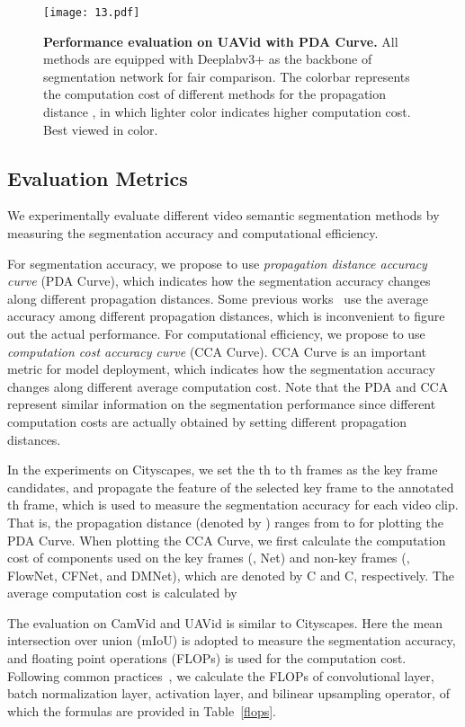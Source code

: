 \documentclass[journal]{IEEEtran}
\begin{document}
\begin{figure}[t]
	\begin{center}
		\texttt{[image: 13.pdf]}
	\end{center}
	\caption{\textbf{Performance evaluation on UAVid with PDA Curve.} All methods are equipped with Deeplabv3+ as the backbone of segmentation network for fair comparison. The colorbar represents the computation cost of different methods for the propagation distance , in which lighter color indicates higher computation cost. Best viewed in color.}
	\label{exp_SCM_uavid}
\end{figure}

\subsection{Evaluation Metrics}
We experimentally evaluate different video semantic segmentation methods by measuring the segmentation accuracy and computational efficiency. 

For segmentation accuracy, we propose to use \emph{propagation distance \vs accuracy curve} (PDA Curve), which indicates how the segmentation accuracy changes along different propagation distances. Some previous works~\cite{zhu2017deep,jain2019accel} use the average accuracy among different propagation distances, which is inconvenient to figure out the actual performance. For computational efficiency, we propose to use \emph{computation cost \vs accuracy curve} (CCA Curve). CCA Curve is an important metric for model deployment, which indicates how the segmentation accuracy changes along different average computation cost.
Note that the PDA and CCA represent similar information on the segmentation performance since different computation costs are actually obtained by setting different propagation distances.

In the experiments on Cityscapes, we set the {th} to {th} frames as the key frame candidates, and propagate the feature of the selected key frame to the annotated {th} frame, which is used to measure the segmentation accuracy for each video clip. That is, the propagation distance (denoted by ) ranges from  to  for plotting the PDA Curve. When plotting the CCA Curve, we first calculate the computation cost of components used on the key frames (\ie, Net) and non-key frames (\ie, FlowNet, CFNet, and DMNet), which are denoted by C and C, respectively. The average computation cost is calculated by

The evaluation on CamVid and UAVid is similar to Cityscapes. Here the mean intersection over union (mIoU) is adopted to measure the segmentation accuracy, and floating point operations (FLOPs) is used for the computation cost. Following common practices~\cite{molchanov2019pruning,howard2017mobilenets}, we calculate the FLOPs of convolutional layer, batch normalization layer, activation layer, and bilinear upsampling operator, of which the formulas are provided in Table~\ref{flops}. 
\end{document}
